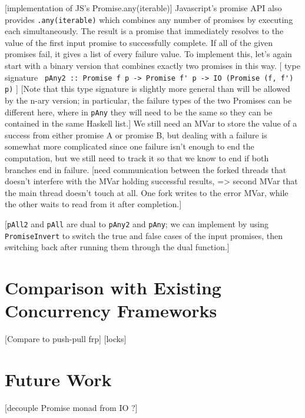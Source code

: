\documentclass[sigplan,screen,review]{acmart}
\newcommand{\lit}[1]{\lstinline{#1}}
\begin{document}
[implementation of JS's Promise.any(iterable)] Javascript's promise API also provides \lit{.any(iterable)} which combines any number of promises by executing each simultaneously.  The result is a promise that immediately resolves to the value of the first input promise to successfully complete.  If all of the given promises fail, it gives a list of every failure value.  To implement this, let's again start with a binary version that combines exactly two promises in this way.  [ type signature \lit{ pAny2 :: Promise f p -> Promise f' p -> IO (Promise (f, f') p)} ] [Note that this type signature is slightly more general than will be allowed by the n-ary version; in particular, the failure types of the two Promises can be different here, where in \lit{pAny} they will need to be the same so they can be contained in the same Haskell list.]  We still need an MVar to store the value of a success from either promise A or promise B, but dealing with a failure is somewhat more complicated since one failure isn't enough to end the computation, but we still need to track it so that we know to end if both branches end in failure. [need communication between the forked threads that doesn't interfere with the MVar holding successful results, => second MVar that the main thread doesn't touch at all.  One fork writes to the error MVar, while the other waits to read from it after completion.]

[\lit{pAll2} and \lit{pAll} are dual to \lit{pAny2} and \lit{pAny}; we can implement by using \lit{PromiseInvert} to switch the true and false cases of the input promises, then switching back after running them through the dual function.]

\section{Comparison with Existing Concurrency Frameworks}
[Compare to push-pull frp]
[locks]

\section{Future Work}

[decouple Promise monad from IO ?]
\end{document}
